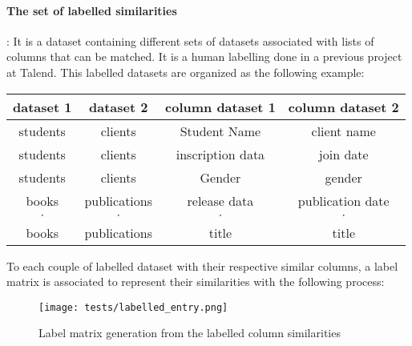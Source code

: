 \paragraph{The set of labelled similarities}:
\label{parag:labelled_ds}
It is a dataset containing
different sets of datasets associated with lists of columns that can be matched.
It is a human labelling done in a previous project at Talend. This labelled
datasets are organized as the following example:
\begin{center}
    \begin{tabular}{|c | c | c | c|}
        \hline
        \textbf{dataset 1} & \textbf{dataset 2} & \textbf{column dataset 1} &
        \textbf{column dataset 2}
        \\
        \hline
        students           & clients            & Student Name              &
        client name                                                           \\
        \hline
        students           & clients            & inscription data          &
        join date                                                             \\
        \hline
        students           & clients            & Gender                    &
        gender                                                                \\
        \hline
        books              & publications       & release data              &
        publication date                                                      \\
        \hline
        $\cdot$            & $\cdot$            & $\cdot$                   &
        $\cdot$                                                               \\
        \hline
        books              & publications       & title                     &
        title                                                                 \\
        \hline
    \end{tabular}
\end{center}

To each couple of labelled dataset with their respective similar columns, a
label matrix is associated to represent their similarities with the following
process:

\begin{figure}[h]
    \centering
    \texttt{[image: tests/labelled\_entry.png]}
    \caption{Label matrix generation from the labelled column similarities}
    \label{fig:label_matrix}
\end{figure}



